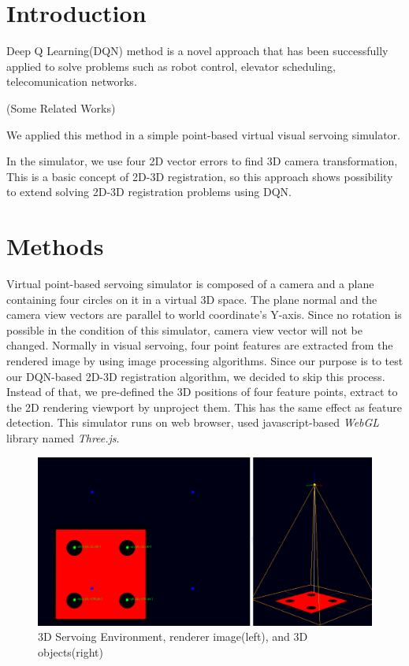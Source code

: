 \documentclass[10pt]{article}
\begin{document}
\section{Introduction}

 Deep Q Learning(DQN) method is a novel approach that has been successfully applied to solve problems such as robot control, elevator scheduling, telecomunication networks.

 (Some Related Works)

 We applied this method in a simple point-based virtual visual servoing simulator.

 In the simulator, we use four 2D vector errors to find 3D camera transformation, This is a basic concept of 2D-3D registration, so this approach shows possibility to extend solving 2D-3D registration problems using DQN.


\section{Methods}
Virtual point-based servoing simulator is composed of a camera and a plane containing four circles on it in a virtual 3D space. The plane normal and the camera view vectors are parallel to world coordinate's Y-axis. Since no rotation is possible in the condition of this simulator, camera view vector will not be changed. Normally in visual servoing, four point features are extracted from the rendered image by using image processing algorithms. Since our purpose is to test our DQN-based 2D-3D registration algorithm, we decided to skip this process. Instead of that, we pre-defined the 3D positions of four feature points, extract to the 2D rendering viewport by unproject them. This has the same effect as feature detection. This simulator runs on web browser, used javascript-based \emph{WebGL} library named \emph{Three.js}.

\begin{figure}[htb]
\begin{center}
\includegraphics[width=0.8\columnwidth]{images/fig-temp1.png}
\caption{3D Servoing Environment, renderer image(left), and 3D objects(right)}
\label{fig1}
\end{center}
\end{figure}
\end{document}
